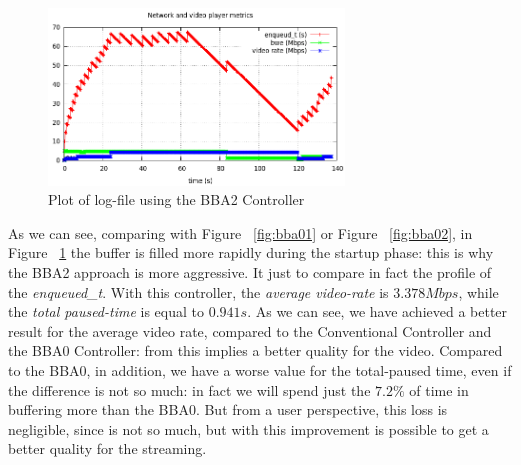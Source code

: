\documentclass[a4paper]{report}
\begin{document}
\begin{figure}[H]
  \begin{center}
    \includegraphics[width=0.7\textwidth]{bba2plot}
  \end{center}
  \caption{Plot of log-file using the BBA2 Controller}\label{fig:bba2}
\end{figure}

As we can see, comparing with Figure ~\ref{fig:bba01} or Figure ~\ref{fig:bba02}, in  Figure ~\ref{fig:bba2} the buffer is filled more rapidly during the startup phase: this is why the BBA2 approach is more aggressive. It just to compare in fact the profile of the \textit{enqueued\_t}.
With this controller, the \textit{average video-rate} is $3.378 Mbps$, while the \textit{total paused-time} is equal to $0.941 s$.
As we can see, we have achieved a better result for the average video rate, compared to the Conventional Controller and the BBA0 Controller: from this implies a better quality for the video. Compared to the BBA0, in addition, we have a worse value for the total-paused time, even if the difference is not so much: in fact we will spend just the $7.2\%$ of time in buffering more than the BBA0.
But from a user perspective, this loss is negligible, since is not so much, but with this improvement is possible to get a better quality for the streaming.




\end{document}
